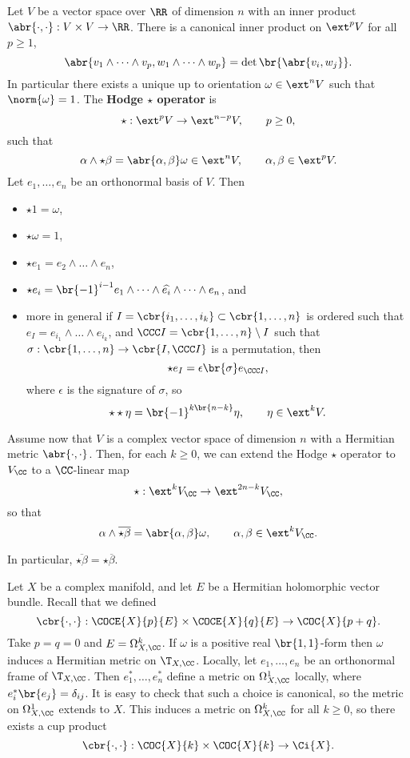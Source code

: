 Let $ V $ be a vector space over $ \RR $ of dimension $ n $ with an inner product $ \abr{\cdot, \cdot} : V \times V \to \RR $. There is a canonical inner product on $ \ext^pV $ for all $ p \ge 1 $,
$$ \abr{v_1 \wedge \dots \wedge v_p, w_1 \wedge \dots \wedge w_p} = \det \br{\abr{v_i, w_j}}. $$
In particular there exists a unique up to orientation $ \omega \in \ext^nV $ such that $ \norm{\omega} = 1 $. The \textbf{Hodge $ \star $ operator} is
$$ \star : \ext^pV \to \ext^{n - p}V, \qquad p \ge 0, $$
such that
$$ \alpha \wedge \star\beta = \abr{\alpha, \beta}\omega \in \ext^nV, \qquad \alpha, \beta \in \ext^pV. $$
Let $ e_1, \dots, e_n $ be an orthonormal basis of $ V $. Then
\begin{itemize}
\item $ \star 1 = \omega $,
\item $ \star\omega = 1 $,
\item $ \star e_1 = e_2 \wedge \dots \wedge e_n $,
\item $ \star e_i = \br{-1}^{i - 1}e_1 \wedge \dots \wedge \widehat{e_i} \wedge \dots \wedge e_n $, and
\item more in general if $ I = \cbr{i_1, \dots, i_k} \subset \cbr{1, \dots, n} $ is ordered such that $ e_I = e_{i_1} \wedge \dots \wedge e_{i_k} $, and $ \CCC I = \cbr{1, \dots, n} \setminus I $ such that $ \sigma : \cbr{1, \dots, n} \to \cbr{I, \CCC I} $ is a permutation, then
$$ \star e_I = \epsilon\br{\sigma}e_{\CCC I}, $$
where $ \epsilon $ is the signature of $ \sigma $, so
$$ \star\star\eta = \br{-1}^{k\br{n - k}}\eta, \qquad \eta \in \ext^kV. $$
\end{itemize}
Assume now that $ V $ is a complex vector space of dimension $ n $ with a Hermitian metric $ \abr{\cdot, \cdot} $. Then, for each $ k \ge 0 $, we can extend the Hodge $ \star $ operator to $ V_\CC $ to a $ \CC $-linear map
$$ \star : \ext^kV_\CC \to \ext^{2n - k}V_\CC, $$
so that
$$ \alpha \wedge \overline{\star\beta} = \abr{\alpha, \beta}\omega, \qquad \alpha, \beta \in \ext^kV_\CC. $$

\begin{note*}
In particular, $ \overline{\star\beta} = \star\overline{\beta} $.
\end{note*}

\pagebreak

Let $ X $ be a complex manifold, and let $ E $ be a Hermitian holomorphic vector bundle. Recall that we defined
$$ \cbr{\cdot, \cdot} : \COCE{X}{p}{E} \times \COCE{X}{q}{E} \to \COC{X}{p + q}. $$
Take $ p = q = 0 $ and $ E = \Omega_{X, \CC}^k $. If $ \omega $ is a positive real $ \br{1, 1} $-form then $ \omega $ induces a Hermitian metric on $ \T_{X, \CC} $. Locally, let $ e_1, \dots, e_n $ be an orthonormal frame of $ \T_{X, \CC} $. Then $ e_1^*, \dots, e_n^* $ define a metric on $ \Omega_{X, \CC}^1 $ locally, where $ e_i^*\br{e_j} = \delta_{ij} $. It is easy to check that such a choice is canonical, so the metric on $ \Omega_{X, \CC}^1 $ extends to $ X $. This induces a metric on $ \Omega_{X, \CC}^k $ for all $ k \ge 0 $, so there exists a cup product
$$ \cbr{\cdot, \cdot} : \COC{X}{k} \times \COC{X}{k} \to \Ci{X}. $$

